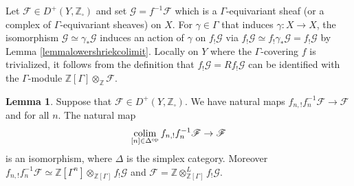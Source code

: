 \documentclass{article}
\theoremstyle{definition}
\newtheorem{lemma}[theorem]{Lemma}
\def\sF{{\mathscr{F}}}
\def\sG{{\mathscr{G}}}
\def\bbZ{\mathbb{Z}}
\DeclareMathOperator{\colim}{colim}
\begin{document}
Let $\sF\in D^+(Y,\bbZ_{\square})$ and set $\sG=f^{-1}\sF$ which is a $\Gamma$-equivariant sheaf (or a complex of $\Gamma$-equivariant sheaves) on $X$. For $\gamma\in \Gamma$ that induces $\gamma:X\rightarrow X$, the isomorphism $\sG\simeq \gamma_*\sG$ induces an action of $\gamma$ on $f_!\sG$ via $f_!\sG\simeq f_!\gamma_*\sG=f_!\sG$ by Lemma \ref{lemmalowershriekcolimit}. Locally on $Y$ where the $\Gamma$-covering $f$ is trivialized, it follows from the definition that $f_!\sG=Rf_!\sG$ can be identified with the $\Gamma$-module $\bbZ[\Gamma]\otimes_{\bbZ}\sF$. 
\begin{lemma}\label{lemmashriekdescent}
	Suppose that $\sF\in D^+(Y,\bbZ_{\square})$. We have natural maps $f_{n,!}f_n^{-1}\sF\rightarrow \sF$ and for all $n$. The natural map 
	\[\colim_{[n]\in\Delta^{\rm op}}f_{n,!}f_n^{-1}\sF\rightarrow \sF\]
	is an isomorphism, where $\Delta$ is the simplex category. Moreover $f_{n,!}f_n^{-1}\sF\simeq \bbZ[\Gamma^n]\otimes_{\bbZ[\Gamma]}f_!\sG$ and $\sF=\bbZ\otimes^L_{\bbZ[\Gamma]}f_!\sG$.
\end{lemma}
\end{document}

